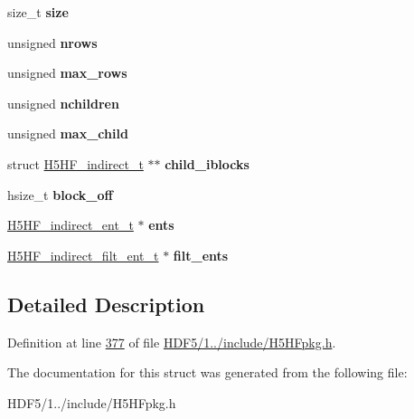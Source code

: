 \begin{DoxyCompactItemize}
size\+\_\+t {\bfseries size}
\item 
\mbox{\label{struct_h5_h_f__indirect__t_a4aeb39ca7d7b5cac1c134d65cba5add3}} 
unsigned {\bfseries nrows}
\item 
\mbox{\label{struct_h5_h_f__indirect__t_abc3448c982bca89e8c61f1db7033bef9}} 
unsigned {\bfseries max\+\_\+rows}
\item 
\mbox{\label{struct_h5_h_f__indirect__t_af51290d13bc3d76234980663ad17e30f}} 
unsigned {\bfseries nchildren}
\item 
\mbox{\label{struct_h5_h_f__indirect__t_a08abe781ca651be85b13c33fab961712}} 
unsigned {\bfseries max\+\_\+child}
\item 
\mbox{\label{struct_h5_h_f__indirect__t_a2a2611b341ac121fc8d910f6380780ea}} 
struct \hyperlink{struct_h5_h_f__indirect__t}{H5\+H\+F\+\_\+indirect\+\_\+t} $\ast$$\ast$ {\bfseries child\+\_\+iblocks}
\item 
\mbox{\label{struct_h5_h_f__indirect__t_a1baa1ee8489bad0ffd35dba9b0309ccf}} 
hsize\+\_\+t {\bfseries block\+\_\+off}
\item 
\mbox{\label{struct_h5_h_f__indirect__t_a3f48b2b61371cb352fcbadbbecadeb63}} 
\hyperlink{struct_h5_h_f__indirect__ent__t}{H5\+H\+F\+\_\+indirect\+\_\+ent\+\_\+t} $\ast$ {\bfseries ents}
\item 
\mbox{\label{struct_h5_h_f__indirect__t_a6af7935c4e31e134f89d9dab7be60752}} 
\hyperlink{struct_h5_h_f__indirect__filt__ent__t}{H5\+H\+F\+\_\+indirect\+\_\+filt\+\_\+ent\+\_\+t} $\ast$ {\bfseries filt\+\_\+ents}
\end{DoxyCompactItemize}


\subsection{Detailed Description}


Definition at line \hyperlink{_h_d_f5_21_810_81_2include_2_h5_h_fpkg_8h_source_l00377}{377} of file \hyperlink{_h_d_f5_21_810_81_2include_2_h5_h_fpkg_8h_source}{H\+D\+F5/1../include/\+H5\+H\+Fpkg.\+h}.



The documentation for this struct was generated from the following file\+:\begin{DoxyCompactItemize}
\item 
H\+D\+F5/1../include/\+H5\+H\+Fpkg.\+h\end{DoxyCompactItemize}
